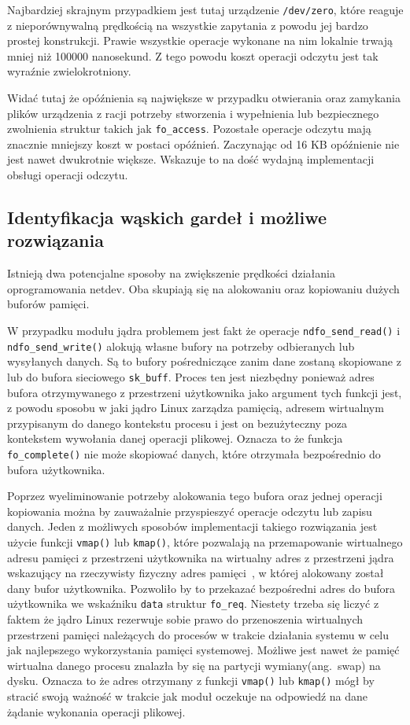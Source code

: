 \documentclass[11pt]{scrartcl}
\begin{document}
Najbardziej skrajnym przypadkiem jest tutaj urządzenie \texttt{/dev/zero}, które reaguje z nieporównywalną prędkością na wszystkie zapytania z powodu jej bardzo prostej konstrukcji. Prawie wszystkie operacje wykonane na nim lokalnie trwają mniej niż 100000 nanosekund. Z tego powodu koszt operacji odczytu jest tak wyraźnie zwielokrotniony.

Widać tutaj że opóźnienia są największe w przypadku otwierania oraz zamykania plików urządzenia z racji potrzeby stworzenia i wypełnienia lub bezpiecznego zwolnienia struktur takich jak \texttt{fo\_access}. Pozostałe operacje odczytu mają znacznie mniejszy koszt w postaci opóźnień. Zaczynając od 16 KB opóźnienie nie jest nawet dwukrotnie większe. Wskazuje to na dość wydajną implementacji obsługi operacji odczytu.

\subsection{Identyfikacja wąskich gardeł i możliwe rozwiązania}

Istnieją dwa potencjalne sposoby na zwiększenie prędkości działania oprogramowania netdev. Oba skupiają się na alokowaniu oraz kopiowaniu dużych buforów pamięci.

W przypadku modułu jądra problemem jest fakt że operacje \texttt{ndfo\_send\_read()} i \texttt{ndfo\_send\_write()} alokują własne bufory na potrzeby odbieranych lub wysyłanych danych. Są to bufory pośredniczące zanim dane zostaną skopiowane z lub do bufora sieciowego \texttt{sk\_buff}. Proces ten jest niezbędny ponieważ adres bufora otrzymywanego z przestrzeni użytkownika jako argument tych funkcji jest, z powodu sposobu w jaki jądro Linux zarządza pamięcią, adresem wirtualnym przypisanym do danego kontekstu procesu i jest on bezużyteczny poza kontekstem wywołania danej operacji plikowej. Oznacza to że funkcja \texttt{fo\_complete()} nie może skopiować danych, które otrzymała bezpośrednio do bufora użytkownika.

Poprzez wyeliminowanie potrzeby alokowania tego bufora oraz jednej operacji kopiowania można by zauważalnie przyspieszyć operacje odczytu lub zapisu danych. Jeden z możliwych sposobów implementacji takiego rozwiązania jest użycie funkcji \texttt{vmap()} lub \texttt{kmap()}, które pozwalają na przemapowanie wirtualnego adresu pamięci z przestrzeni użytkownika na wirtualny adres z przestrzeni jądra wskazujący na rzeczywisty fizyczny adres pamięci~\cite{kmap}, w której alokowany został dany bufor użytkownika. Pozwoliło by to przekazać bezpośredni adres do bufora użytkownika we wskaźniku \texttt{data} struktur \texttt{fo\_req}. Niestety trzeba się liczyć z faktem że jądro Linux rezerwuje sobie prawo do przenoszenia wirtualnych przestrzeni pamięci należących do procesów w trakcie działania systemu w celu jak najlepszego wykorzystania pamięci systemowej. Możliwe jest nawet że pamięć wirtualna danego procesu znalazła by się na partycji wymiany(ang.\ swap) na dysku. Oznacza to że adres otrzymany z funkcji \texttt{vmap()} lub \texttt{kmap()} mógł by stracić swoją ważność w trakcie jak moduł oczekuje na odpowiedź na dane żądanie wykonania operacji plikowej.
\end{document}
